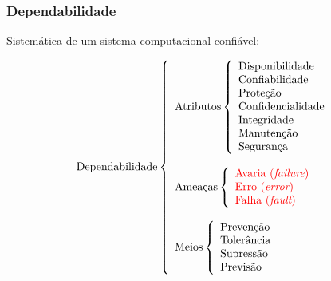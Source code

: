 \documentclass{beamer}
\begin{document}
\begin{frame}
    \frametitle{Dependabilidade}

    Sistemática de um sistema computacional confiável:

\begin{figure}[htb]
\centering
\footnotesize
\[
\text{Dependabilidade}
\left\{
\begin{array}{l}
\text{Atributos}
    \left\{
    \begin{array}{l}
        \text{Disponibilidade}\\
        \text{Confiabilidade}\\
        \text{Proteção}\\
        \text{Confidencialidade}\\
        \text{Integridade}\\
        \text{Manutenção}\\
        \text{Segurança}
    \end{array}
    \right.
\\
\\
\text{Ameaças}
    \left\{
    \begin{array}{l}
        \text{\color{red} Avaria ({\it failure})}\\
        \text{\color{red} Erro ({\it error})}\\
        \text{\color{red} Falha ({\it fault})}
    \end{array}
    \right.
\\
\\
\text{Meios}
    \left\{
    \begin{array}{l}
        \text{Prevenção}\\
        \text{Tolerância}\\
        \text{Supressão}\\
        \text{Previsão}
    \end{array}
    \right.
\end{array}
\right.
\]
\end{figure}

\end{frame}
\end{document}
